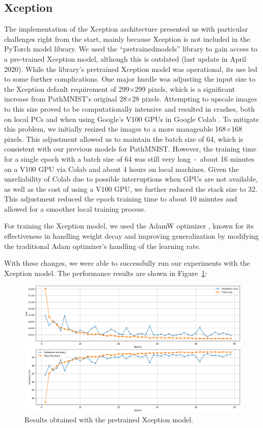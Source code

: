 \subsection{Xception}\label{resultsXceptions}

The implementation of the Xception architecture presented us with particular challenges right from the start, mainly because Xception is not included in the PyTorch model library. We used the ``pretrainedmodels'' library \citep{cadene2023pretrainedmodels} to gain access to a pre-trained Xception model, although this is outdated (last update in April 2020). While the library's pretrained Xception model was operational, its use led to some further complications.
One major hurdle was adjusting the input size to the Xception default requirement of 299$\times$299 pixels, which is a significant increase from PathMNIST's original 28$\times$28 pixels. Attempting to upscale images to this size proved to be computationally intensive and resulted in crashes, both on local PCs and when using Google's V100 GPUs in Google Colab \citep{googlecolab2024}. To mitigate this problem, we initially resized the images to a more manageable 168$\times$168 pixels. This adjustment allowed us to maintain the batch size of 64, which is consistent with our previous models for PathMNIST\@. However, the training time for a single epoch with a batch size of 64 was still very long~-~about 16 minutes on a V100 GPU via Colab and about 4 hours on local machines. Given the unreliability of Colab due to possible interruptions when GPUs are not available, as well as the cost of using a V100 GPU, we further reduced the stack size to 32. This adjustment reduced the epoch training time to about 10 minutes and allowed for a smoother local training process.

For training the Xception model, we used the AdamW optimizer \citep{loshchilov2019decoupled}, known for its effectiveness in handling weight decay and improving generalization by modifying the traditional Adam optimizer's handling of the learning rate.

With these changes, we were able to successfully run our experiments with the Xception model. The performance results are shown in Figure~\ref{fig:xception_PathMNIST}:

\begin{figure} [ht]
    \centering
    \includegraphics[width=.8\textwidth]{figures/xception_PathMNIST_result.png}
    \caption{Results obtained with the pretrained Xception model.}\label{fig:xception_PathMNIST}
\end{figure}
